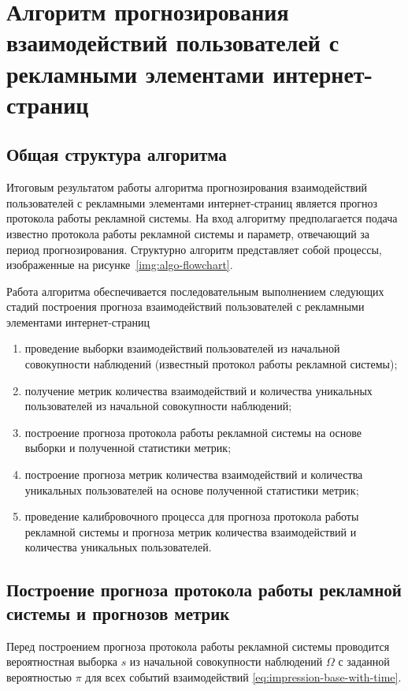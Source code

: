 \section{Алгоритм прогнозирования взаимодействий пользователей с рекламными элементами интернет-страниц}
\subsection{Общая структура алгоритма}
Итоговым результатом работы алгоритма прогнозирования взаимодействий пользователей с рекламными элементами
интернет-страниц является прогноз протокола работы рекламной системы. На вход алгоритму предполагается
подача известно протокола работы рекламной системы и параметр, отвечающий за период прогнозирования. 
Структурно алгоритм представляет собой процессы, изображенные на рисунке~\ref{img:algo-flowchart}.


Работа алгоритма обеспечивается последовательным выполнением следующих стадий построения прогноза взаимодействий 
пользователей с рекламными элементами интернет-страниц
\begin{enumerate}
    \item проведение выборки взаимодействий пользователей из начальной совокупности наблюдений (известный протокол
    работы рекламной системы);
    \item получение метрик количества взаимодействий и количества уникальных пользователей из начальной совокупности 
    наблюдений;
    \item построение прогноза протокола работы рекламной системы на основе выборки и полученной статистики метрик;
    \item построение прогноза метрик количества взаимодействий и количества уникальных пользователей на основе 
    полученной статистики метрик;
    \item проведение калибровочного процесса для прогноза протокола работы рекламной системы и прогноза метрик количества
    взаимодействий и количества уникальных пользователей.
\end{enumerate}

\subsection{Построение прогноза протокола работы рекламной системы и прогнозов метрик}
Перед построением прогноза протокола работы рекламной системы проводится вероятностная выборка $s$ из начальной совокупности 
наблюдений $\Omega$ с заданной вероятностью $\pi$ для всех событий взаимодействий \eqref{eq:impression-base-with-time}.

